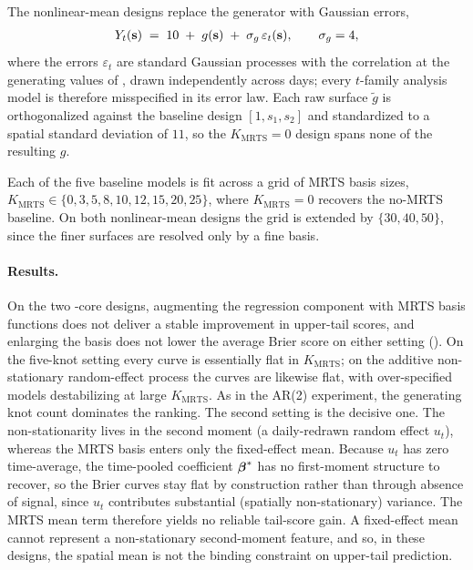 \documentclass[12pt]{article}
\begin{document}
The nonlinear-mean designs replace the \skewt generator with Gaussian errors,
\begin{align}
  Y_t(\mbox{\bf s}) \;=\; 10 \;+\; g(\mbox{\bf s}) \;+\; \sigma_g\, \varepsilon_t(\mbox{\bf s}), \qquad \sigma_g = 4,
  \label{eq:nont-gen}
\end{align}
where the errors $\varepsilon_t$ are standard Gaussian processes with the \Matern correlation  at the generating values of , drawn independently across days; every $t$-family analysis model is therefore misspecified in its error law.  Each raw surface $\tilde g$ is orthogonalized against the baseline design $[1, s_1, s_2]$ and standardized to a spatial standard deviation of $11$, so the $K_{\mathrm{MRTS}} = 0$ design spans none of the resulting $g$.

Each of the five baseline models is fit across a grid of MRTS basis sizes, $K_{\mathrm{MRTS}} \in \{0, 3, 5, 8, 10, 12, 15, 20, 25\}$, where $K_{\mathrm{MRTS}} = 0$ recovers the no-MRTS baseline.  On both nonlinear-mean designs the grid is extended by $\{30, 40, 50\}$, since the finer surfaces are resolved only by a fine basis.

\paragraph{Results.}\label{sec:sim-mrts-results}
On the two \skewt-core designs, augmenting the regression component with MRTS basis functions does not deliver a stable improvement in upper-tail scores, and enlarging the basis does not lower the average Brier score on either setting ().  On the five-knot setting every curve is essentially flat in $K_{\mathrm{MRTS}}$; on the additive non-stationary random-effect process the curves are likewise flat, with over-specified models destabilizing at large $K_{\mathrm{MRTS}}$.  As in the AR(2) experiment, the generating knot count dominates the ranking.  The second setting is the decisive one.  The non-stationarity lives in the second moment (a daily-redrawn random effect $u_t$), whereas the MRTS basis enters only the fixed-effect mean.  Because $u_t$ has zero time-average, the time-pooled coefficient $\mbox{\boldmath $\beta$}^*$ has no first-moment structure to recover, so the Brier curves stay flat by construction rather than through absence of signal, since $u_t$ contributes substantial (spatially non-stationary) variance.  The MRTS mean term therefore yields no reliable tail-score gain.  A fixed-effect mean cannot represent a non-stationary second-moment feature, and so, in these designs, the spatial mean is not the binding constraint on upper-tail prediction.
\end{document}
